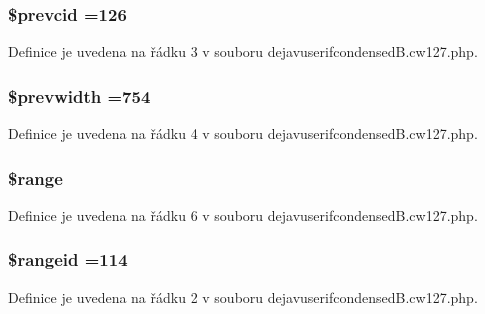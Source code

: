 \hypertarget{dejavuserifcondensed_b_8cw127_8php_af9586406f81f4c60e4f21823e5af1f1d}{
\subsubsection[{\$prevcid}]{\setlength{\rightskip}{0pt plus 5cm}\$prevcid =126}}\label{dejavuserifcondensed_b_8cw127_8php_af9586406f81f4c60e4f21823e5af1f1d}


Definice je uvedena na řádku 3 v souboru dejavuserifcondensed\-B.\-cw127.\-php.

\hypertarget{dejavuserifcondensed_b_8cw127_8php_afc01c27a4bb149f1386368eb7c57f324}{
\subsubsection[{\$prevwidth}]{\setlength{\rightskip}{0pt plus 5cm}\$prevwidth =754}}\label{dejavuserifcondensed_b_8cw127_8php_afc01c27a4bb149f1386368eb7c57f324}


Definice je uvedena na řádku 4 v souboru dejavuserifcondensed\-B.\-cw127.\-php.

\hypertarget{dejavuserifcondensed_b_8cw127_8php_ac2e4b5fa63099d7c943a803ae122dd2b}{
\subsubsection[{\$range}]{\setlength{\rightskip}{0pt plus 5cm}\$range}}\label{dejavuserifcondensed_b_8cw127_8php_ac2e4b5fa63099d7c943a803ae122dd2b}


Definice je uvedena na řádku 6 v souboru dejavuserifcondensed\-B.\-cw127.\-php.

\hypertarget{dejavuserifcondensed_b_8cw127_8php_a555224809a2d03766193a06c6f4ea061}{
\subsubsection[{\$rangeid}]{\setlength{\rightskip}{0pt plus 5cm}\$rangeid =114}}\label{dejavuserifcondensed_b_8cw127_8php_a555224809a2d03766193a06c6f4ea061}


Definice je uvedena na řádku 2 v souboru dejavuserifcondensed\-B.\-cw127.\-php.

